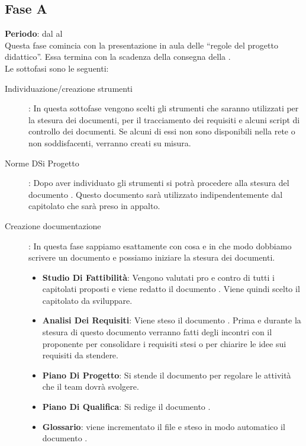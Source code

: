 \subsection{Fase A}
	\textbf{Periodo}: dal  al  \\
	Questa fase comincia con la presentazione in aula delle “regole del progetto didattico”. Essa termina con la scadenza della consegna della .\\Le sottofasi sono le seguenti:
	\begin{description}
		\item[Individuazione/creazione strumenti]: In questa sottofase vengono scelti gli strumenti che saranno utilizzati per la stesura dei documenti, per il tracciamento dei requisiti e alcuni script di controllo dei documenti. Se alcuni di essi non sono disponibili nella rete o non soddisfacenti, verranno creati su misura.
		\item[Norme DSi Progetto]: Dopo aver individuato gli strumenti si potrà procedere alla stesura del documento . Questo documento sarà utilizzato indipendentemente dal capitolato che sarà preso in appalto.
		\item[Creazione documentazione]: In questa fase sappiamo esattamente con cosa e in che modo dobbiamo scrivere un documento e possiamo iniziare la stesura dei documenti.
			\begin{itemize}
				\item \textbf{Studio Di Fattibilità}: Vengono valutati pro e contro di tutti i capitolati proposti e viene redatto il documento . Viene quindi scelto il capitolato da sviluppare.
				\item \textbf{Analisi Dei Requisiti}: Viene steso il documento . Prima e durante la stesura di questo documento verranno fatti degli incontri con il proponente per consolidare i requisiti stesi o per chiarire le idee sui requisiti da stendere.
				\item \textbf{Piano Di Progetto}: Si stende il documento  per regolare le attività che il team dovrà svolgere.
				\item \textbf{Piano Di Qualifica}: Si redige il documento .
				\item \textbf{Glossario}: viene incrementato il file   e steso in modo automatico il documento .
			\end{itemize}
	\end{description}

